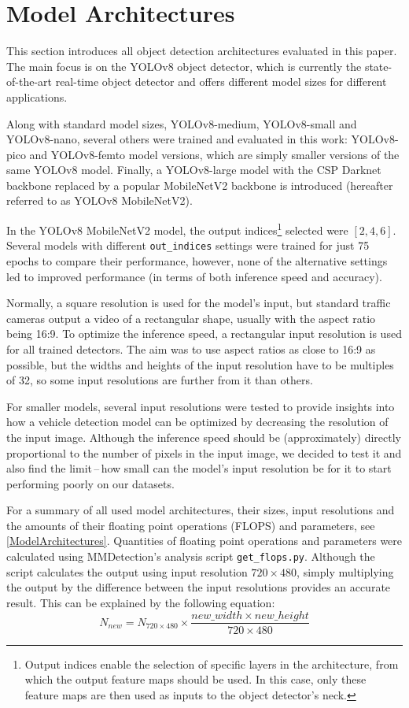 \section{Model Architectures}


This section introduces all object detection architectures evaluated in this
paper.  The main focus is on the YOLOv8 object detector, which is currently the
state-of-the-art real-time object detector and offers different model sizes for
different applications.

Along with standard model sizes, YOLOv8-medium, YOLOv8-small and YOLOv8-nano,
several others were trained and evaluated in this work: YOLOv8-pico and
YOLOv8-femto model versions, which are simply smaller versions of the same
YOLOv8 model. Finally, a YOLOv8-large model with the CSP Darknet backbone
replaced by a popular MobileNetV2 backbone is introduced (hereafter referred to
as YOLOv8 MobileNetV2).

In the YOLOv8 MobileNetV2 model, the output indices\footnote{Output indices
enable the selection of specific layers in the architecture, from which the
output feature maps should be used. In this case, only these feature maps are
then used as inputs to the object detector's neck.} selected were $[2, 4, 6]$.
Several models with different \texttt{out\_indices} settings were trained for
just 75 epochs to compare their performance, however, none of the alternative
settings led to improved performance (in terms of both inference speed and
accuracy).

Normally, a square resolution is used for the model's input, but standard traffic cameras
output a video of a rectangular shape, usually with the aspect ratio being 16:9.
To optimize the inference speed, a rectangular input resolution is used for all
trained detectors. The aim was to use aspect ratios as close to 16:9 as
possible, but the widths and heights of the input resolution have to be multiples of
32, so some input resolutions are further from it than others.

For smaller models, several input resolutions were tested to provide insights
into how a vehicle detection model can be optimized by decreasing the resolution
of the input image. Although the inference speed should be (approximately)
directly proportional to the number of pixels in the input image, we decided to
test it and also find the limit\,--\,how small can the model's input resolution
be for it to start performing poorly on our datasets.

For a summary of all used model architectures, their sizes, input resolutions and the
amounts of their floating point operations (FLOPS) and parameters, see
\autoref{ModelArchitectures}. Quantities of floating point operations and
parameters were calculated using MMDetection's analysis script
\verb|get_flops.py|. Although the script calculates the output using input
resolution $720 \times 480$, simply multiplying the output by the difference
between the input resolutions provides an accurate result. This can be explained
by the following equation:
\begin{equation}
    N_{new} = N_{720 \times 480} \times \frac{new\_width \times new\_height}{720 \times 480}
\end{equation}

